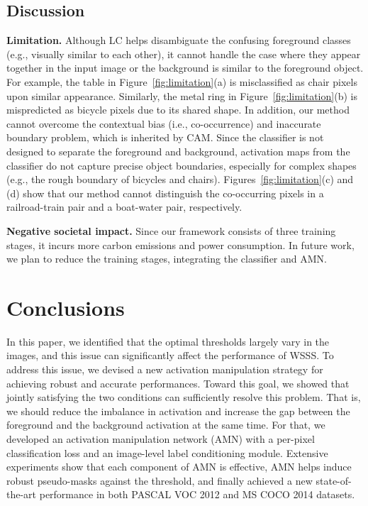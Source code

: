\documentclass[10pt,twocolumn,letterpaper]{article}
\begin{document}
\subsection{Discussion}

\noindent \textbf{Limitation.} Although LC helps disambiguate the confusing foreground classes (e.g., visually similar to each other), it cannot handle the case where they appear together in the input image or the background is similar to the foreground object. For example, the table in Figure~\ref{fig:limitation}(a) is misclassified as chair pixels upon similar appearance. Similarly, the metal ring in Figure~\ref{fig:limitation}(b) is mispredicted as bicycle pixels due to its shared shape. In addition, our method cannot overcome the contextual bias (i.e., co-occurrence) and inaccurate boundary problem, which is inherited by CAM. Since the classifier is not designed to separate the foreground and background, activation maps from the classifier do not capture precise object boundaries, especially for complex shapes (e.g., the rough boundary of bicycles and chairs). Figures~\ref{fig:limitation}(c) and (d) show that our method cannot distinguish the co-occurring pixels in a railroad-train pair and a boat-water pair, respectively.

\noindent \textbf{Negative societal impact.} 
Since our framework consists of three training stages, it incurs more carbon emissions and power consumption. In future work, we plan to reduce the training stages, integrating the classifier and AMN.


 \section{Conclusions}

In this paper, we identified that the optimal thresholds largely vary in the images, and this issue can significantly affect the performance of WSSS. To address this issue, we devised a new activation manipulation strategy for achieving robust and accurate performances. Toward this goal, we showed that jointly satisfying the two conditions can sufficiently resolve this problem. That is, we should reduce the imbalance in activation and increase the gap between the foreground and the background activation at the same time. For that, we developed an activation manipulation network (AMN) with a per-pixel classification loss and an image-level label conditioning module. Extensive experiments show that each component of AMN is effective, AMN helps induce robust pseudo-masks against the threshold, and finally achieved a new state-of-the-art performance in both PASCAL VOC 2012 and MS COCO 2014 datasets.
\end{document}
